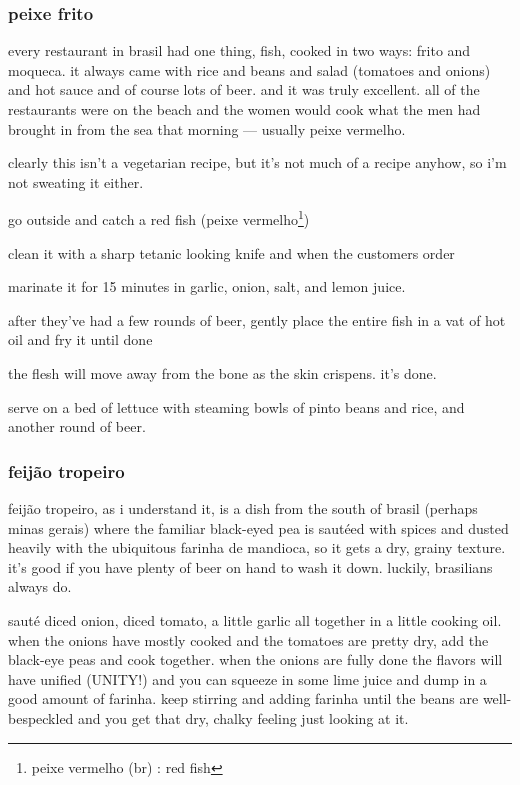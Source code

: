 \subsubsection{peixe frito}

every restaurant in brasil had one thing, fish, cooked in two ways:
frito and moqueca. it always came with rice and beans and salad
(tomatoes and onions) and hot sauce and of course lots of beer. and it
was truly excellent. all of the restaurants were on the beach and the
women would cook what the men had brought in from the sea that morning
--- usually peixe vermelho.

clearly this isn't a vegetarian recipe, but it's not much of a recipe
anyhow, so i'm not sweating it either.

\begin{algorithm}
  \item go outside and catch a red fish (peixe vermelho\footnote{peixe
  vermelho (br) : red fish})

  \item clean it with a sharp tetanic looking knife and when the
  customers order

  \item marinate it for 15 minutes in garlic, onion, salt, and lemon
  juice.

  \item after they've had a few rounds of beer, gently place the
  entire fish in a vat of hot oil and fry it until done

  \item the flesh will move away from the bone as the skin
  crispens. it's done.

  \item serve on a bed of lettuce with steaming bowls of pinto beans
  and rice, and another round of beer.
\end{algorithm}

\subsubsection{feij\~{a}o tropeiro}

feij\~{a}o tropeiro, as i understand it, is a dish from the south of
brasil (perhaps minas gerais) where the familiar black-eyed pea is
saut\'{e}ed with spices and dusted heavily with the ubiquitous farinha
de mandioca, so it gets a dry, grainy texture. it's good if you have
plenty of beer on hand to wash it down. luckily, brasilians always do.

saut\'{e} diced onion, diced tomato, a little garlic all together in a
little cooking oil. when the onions have mostly cooked and the
tomatoes are pretty dry, add the black-eye peas and cook
together. when the onions are fully done the flavors will have unified
(UNITY!) and you can squeeze in some lime juice and dump in a good
amount of farinha. keep stirring and adding farinha until the beans
are well-bespeckled and you get that dry, chalky feeling just looking
at it.

